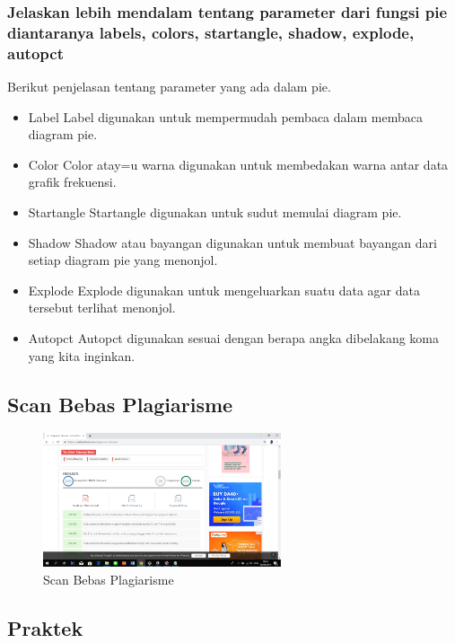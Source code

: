 \subsubsection{Jelaskan lebih mendalam tentang parameter dari fungsi pie diantaranya labels, colors, startangle, shadow, explode, autopct}
\hfill \break
Berikut penjelasan tentang parameter yang ada dalam pie.
\begin{itemize}
    \item Label
    Label digunakan untuk mempermudah pembaca dalam membaca diagram pie.

    \item Color
    Color atay=u warna digunakan untuk membedakan warna antar data grafik frekuensi.

    \item Startangle
    Startangle digunakan untuk sudut memulai diagram pie.

    \item Shadow
    Shadow atau bayangan digunakan untuk membuat bayangan dari setiap diagram pie yang menonjol.

    \item Explode
    Explode digunakan untuk mengeluarkan suatu data agar data tersebut terlihat menonjol.

    \item Autopct
    Autopct digunakan sesuai dengan berapa angka dibelakang koma yang kita inginkan.
\end{itemize}

\subsection{Scan Bebas Plagiarisme}
\begin{figure}[H]
\centering
\includegraphics[width=7cm]{figures/6/1174008/bebasplagiarisme.png}
\caption{Scan Bebas Plagiarisme}
\label{Bebas Plagiarisme}
\end{figure}

\subsection{Praktek}